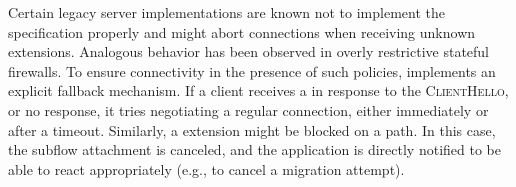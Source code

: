 Certain legacy \tls server implementations are known not to implement the \tls
specification properly and might abort connections when receiving unknown \tls
extensions. Analogous behavior has been observed in overly restrictive stateful
firewalls. To ensure connectivity in the presence of such policies, \tcpls
implements an explicit fallback mechanism. If a client receives a \tcp \rst in
response to the \tcpls \textsc{ClientHello}, or no response, it
tries negotiating a regular \tls connection, either
immediately or after a timeout. Similarly, a \tcpls \join extension might be
blocked on a path. In this case, the subflow attachment is canceled, and
the application is directly notified to be able to react appropriately (e.g.,
to cancel a migration attempt).



